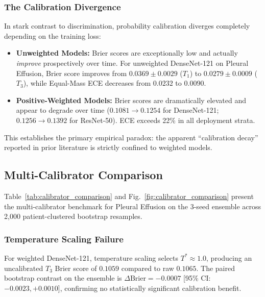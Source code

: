 \documentclass[journal]{IEEEtran}
\begin{document}
\subsubsection{The Calibration Divergence}
In stark contrast to discrimination, probability calibration diverges completely depending on the training loss:
\begin{itemize}
    \item \textbf{Unweighted Models:} Brier scores are exceptionally low and actually \textit{improve} prospectively over time. For unweighted DenseNet-121 on Pleural Effusion, Brier score improves from $0.0369 \pm 0.0029$ ($T_1$) to $0.0279 \pm 0.0009$ ($T_3$), while Equal-Mass ECE decreases from $0.0232$ to $0.0090$.
    \item \textbf{Positive-Weighted Models:} Brier scores are dramatically elevated and appear to degrade over time ($0.1081 \to 0.1254$ for DenseNet-121; $0.1256 \to 0.1392$ for ResNet-50). ECE exceeds 22\% in all deployment strata.
\end{itemize}
This establishes the primary empirical paradox: the apparent ``calibration decay'' reported in prior literature is strictly confined to weighted models.

\begin{table}[!t]
\caption{Experimental Matrix Evaluation: Longitudinal Trajectories across Architectures, Loss Objectives, and Thoracic Pathologies}
\label{tab:factorial_matrix}
\centering
\resizebox{\textwidth}{!}{%

}
\end{table}

\subsection{Multi-Calibrator Comparison}
Table~\ref{tab:calibrator_comparison} and Fig.~\ref{fig:calibrator_comparison} present the multi-calibrator benchmark for Pleural Effusion on the 3-seed ensemble across 2,000 patient-clustered bootstrap resamples.

\begin{table}[!t]
\caption{Multi-Calibrator Comparison on Pleural Effusion: Prospective Ensemble Performance and Paired Bootstrap Contrasts}
\label{tab:calibrator_comparison}
\centering
\resizebox{\textwidth}{!}{%

}
\end{table}

\subsubsection{Temperature Scaling Failure}
For weighted DenseNet-121, temperature scaling selects $T^* \approx 1.0$, producing an uncalibrated $T_3$ Brier score of $0.1059$ compared to raw $0.1065$. The paired bootstrap contrast on the ensemble is $\Delta\text{Brier} = -0.0007$ [95\% CI: $-0.0023, +0.0010$], confirming no statistically significant calibration benefit.
\end{document}
